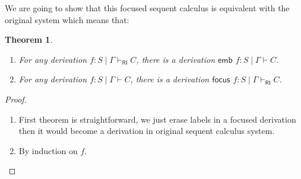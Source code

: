 \documentclass{article}
\newtheorem{theorem}{Theorem}[subsection]
\newtheorem*{proof}{Proof : }
\begin{document}
We are going to show that this focused sequent calculus is equivalent with the original system which means that:
\begin{theorem}
  \begin{enumerate}
    \item For any derivation $f : S \mid \Gamma \vdash_{\mathsf{RI}} C$, there is a derivation $\mathsf{emb}$ $f : S \mid \Gamma \vdash C$.
    \item For any derivation $f : S \mid \Gamma \vdash C$, there is a derivation $\mathsf{focus}$ $f : S \mid \Gamma \vdash_{\mathsf{RI}} C$.
  \end{enumerate}
\end{theorem}
\begin{proof}
  \begin{enumerate}
    \item First theorem is straightforward, we just erase labels in a focused derivation then it would become a derivation in original sequent calculus system.
    \item By induction on $f$.
  \end{enumerate}
\end{proof}
\end{document}

